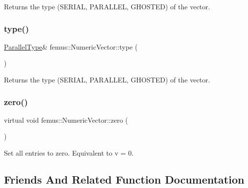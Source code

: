 \begin{DoxyReturn}{Returns}
the type (S\+E\+R\+I\+AL, P\+A\+R\+A\+L\+L\+EL, G\+H\+O\+S\+T\+ED) of the vector. 
\end{DoxyReturn}
\mbox{\label{classfemus_1_1_numeric_vector_aea604bf48a5a24f0a7e3716c3e955820}} 
\subsubsection{\texorpdfstring{type()}{type()}\hspace{0.1cm}{\footnotesize\ttfamily [2/2]}}
{\footnotesize\ttfamily \mbox{\hyperlink{_paralleltype_enum_8hpp_a55f694af2ca20b6481914237cf7e567c}{Parallel\+Type}}\& femus\+::\+Numeric\+Vector\+::type (\begin{DoxyParamCaption}{ }\end{DoxyParamCaption})\hspace{0.3cm}{\ttfamily [inline]}}

\begin{DoxyReturn}{Returns}
the type (S\+E\+R\+I\+AL, P\+A\+R\+A\+L\+L\+EL, G\+H\+O\+S\+T\+ED) of the vector. 
\end{DoxyReturn}
\mbox{\label{classfemus_1_1_numeric_vector_a80b1efdc7101659f2035c2da880360e7}} 
\subsubsection{\texorpdfstring{zero()}{zero()}}
{\footnotesize\ttfamily virtual void femus\+::\+Numeric\+Vector\+::zero (\begin{DoxyParamCaption}{ }\end{DoxyParamCaption})\hspace{0.3cm}{\ttfamily [pure virtual]}}



Set all entries to zero. Equivalent to {\ttfamily v} = 0. 



\subsection{Friends And Related Function Documentation}
\mbox{\label{classfemus_1_1_numeric_vector_a078efc50da3b1d6143d03599e47e1777}} 
